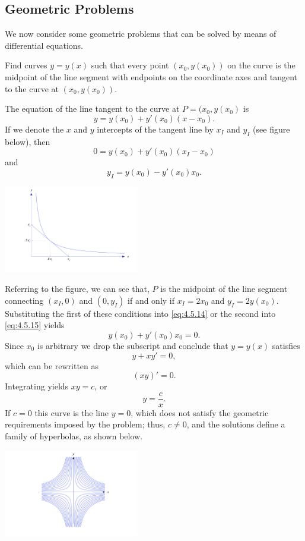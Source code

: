 \documentclass{ximera}
\begin{document}
\subsection*{Geometric Problems}

We now consider some geometric problems that can be solved by means of
differential equations.

\begin{example}\label{example:4.5.7}
Find curves $y=y(x)$ such that every point $(x_0,y(x_0))$ on the curve
is the midpoint of the line segment with endpoints on the coordinate
axes and tangent to the curve at $(x_0,y(x_0))$.

\begin{explanation}
 The equation of the  line tangent to the curve at $P=(x_0,y(x_0)$ is
$$
y=y(x_0)+y'(x_0)(x-x_0).
$$
If we denote the $x$ and $y$ intercepts of the tangent line by $x_I$
and $y_I$ (see figure below), then
\begin{equation} \label{eq:4.5.14}
0=y(x_0)+y'(x_0)(x_I-x_0)
\end{equation}
 and
\begin{equation} \label{eq:4.5.15}
y_I=y(x_0)-y'(x_0)x_0.
\end{equation}

\begin{image}
  \includegraphics[height=1.5in]{fig040506.jpg} 
\end{image}

Referring to the figure, we can see that, $P$ is the midpoint of the line segment
connecting $(x_I,0)$ and $(0,y_I)$ if and only if $x_I=2x_0$ and
$y_I=2y(x_0)$. Substituting the first of these conditions into
\eqref{eq:4.5.14} or the second into \eqref{eq:4.5.15} yields
$$
y(x_0)+y'(x_0)x_0=0.
$$
Since $x_0$ is arbitrary we drop the subscript and conclude that
$y=y(x)$  satisfies
$$
y+xy'=0,
$$
which can be rewritten as
$$
(xy)'=0.
$$
Integrating  yields $xy=c$,  or
$$
y=\frac{c}{x}.
$$
If $c=0$ this curve is the line $y=0$, which does not satisfy the
geometric requirements imposed by the problem;   thus, $c\neq 0$, and the
solutions define a family of hyperbolas, as shown below.

\begin{image}
  \includegraphics[height=1.5in]{fig040507.jpg} 
\end{image}

\end{explanation}
\end{example}
\end{document}
